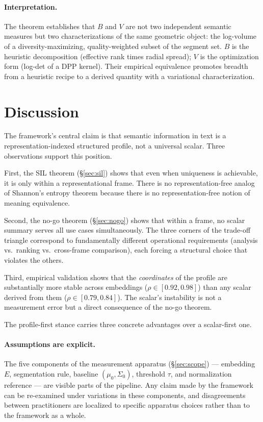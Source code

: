\documentclass[11pt]{article}
\begin{document}
\paragraph{Interpretation.} The theorem establishes that $B$ and $V$ are not two independent semantic measures but two characterizations of the same geometric object: the log-volume of a diversity-maximizing, quality-weighted subset of the segment set. $B$ is the heuristic decomposition (effective rank times radial spread); $V$ is the optimization form (log-det of a DPP kernel). Their empirical equivalence promotes breadth from a heuristic recipe to a derived quantity with a variational characterization.

\section{Discussion}

The framework's central claim is that semantic information in text is a representation-indexed structured profile, not a universal scalar. Three observations support this position.

First, the SIL theorem (\S\ref{sec:sil}) shows that even when uniqueness is achievable, it is only within a representational frame. There is no representation-free analog of Shannon's entropy theorem because there is no representation-free notion of meaning equivalence.

Second, the no-go theorem (\S\ref{sec:nogo}) shows that within a frame, no scalar summary serves all use cases simultaneously. The three corners of the trade-off triangle correspond to fundamentally different operational requirements (analysis vs.\ ranking vs.\ cross-frame comparison), each forcing a structural choice that violates the others.

Third, empirical validation shows that the \emph{coordinates} of the profile are substantially more stable across embeddings ($\rho \in [0.92, 0.98]$) than any scalar derived from them ($\rho \in [0.79, 0.84]$). The scalar's instability is not a measurement error but a direct consequence of the no-go theorem.

The profile-first stance carries three concrete advantages over a scalar-first one.

\paragraph{Assumptions are explicit.} The five components of the measurement apparatus (\S\ref{sec:scope}) --- embedding $E$, segmentation rule, baseline $(\mu_0, \Sigma_0)$, threshold $\tau$, and normalization reference --- are visible parts of the pipeline. Any claim made by the framework can be re-examined under variations in these components, and disagreements between practitioners are localized to specific apparatus choices rather than to the framework as a whole.
\end{document}
